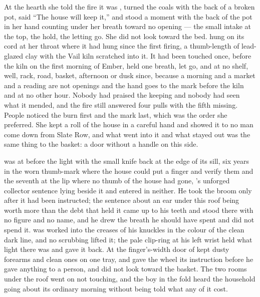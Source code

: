 At the hearth she told the fire it was , turned the coals with the back of a broken pot, said “The house will keep it,” and stood a moment with the back of the pot in her hand counting under her breath toward no opening --- the small intake at the top, the hold, the letting go. She did not look toward the bed.  hung on its cord at her throat where it had hung since the first firing, a thumb-length of lead-glazed clay with the Vail kiln scratched into it. It had been touched once, before the kiln on the first morning of Ember, held one breath, let go, and at no shelf, well, rack, road, basket, afternoon or dusk since, because a morning and a market and a reading are not openings and the hand goes to the mark before the kiln and at no other hour. Nobody had praised the keeping and nobody had seen what it mended, and the fire still answered four pulls with the fifth missing. People noticed the burn first and the mark last, which was the order she preferred. She kept a roll of the house in a careful hand and showed it to no man come down from Slate Row, and what went into it and what stayed out was the same thing to the basket: a door without a handle on this side.

 was at  before the light with the small knife back at the edge of its sill, six years in the worn thumb-mark where the house could put a finger and verify them and the seventh at the lip where no thumb of the house had gone, 's unforged collector sentence lying beside it and entered in neither. He took the broom only after it had been instructed; the sentence about an ear under this roof being worth more than the debt that held it came up to his teeth and stood there with no figure and no name, and he drew the breath he should have spent and did not spend it.  was worked into the creases of his knuckles in the colour of the clean dark line, and no scrubbing lifted it; the pale clip-ring at his left wrist held what light there was and gave it back. At the finger's-width door of   kept dusty forearms and clean ones on one tray, and gave the wheel its instruction before he gave anything to a person, and did not look toward the basket. The two rooms under the roof went on not touching, and the boy in the fold heard the household going about its ordinary morning without being told what any of it cost.

\scenebreak

